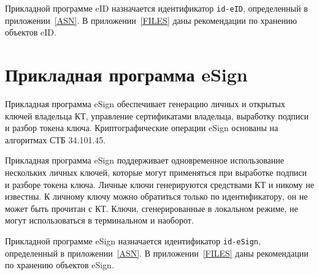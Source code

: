 Прикладной программе eID назначается идентификатор \verb|id-eID|, 
определенный в приложении~\ref{ASN}. В приложении~\ref{FILES}
даны рекомендации по хранению объектов eID.

\section{Прикладная программа eSign}\label{OBJ.eSign}

Прикладная программа eSign обеспечивает генерацию личных и открытых 
ключей владельца КТ, управление сертификатами владельца, 
выработку подписи и разбор токена ключа.
%
Криптографические операции eSign основаны на алгоритмах СТБ 34.101.45.


Прикладная программа eSign поддерживает одновременное 
использование нескольких личных ключей, 
которые могут применяться при выработке подписи и разборе токена ключа.
Личные ключи генерируются средствами КТ и никому не известны. 
К личному ключу можно обратиться только по идентификатору, 
он не может быть прочитан с КТ. 
Ключи, сгенерированные в локальном режиме, не могут использоваться 
в терминальном и наоборот.
\fi

Прикладной программе eSign назначается идентификатор \verb|id-eSign|, 
определенный в приложении~\ref{ASN}. В приложении~\ref{FILES}
даны рекомендации по хранению объектов eSign.


